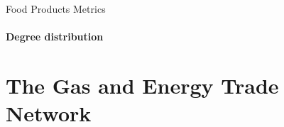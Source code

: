 \begin{table}
    \centering
    
    \caption{Food Products Metrics}
    \label{tab:foodmetrics}
\end{table}

\paragraph{Degree distribution}











\section{The Gas and Energy Trade Network}
